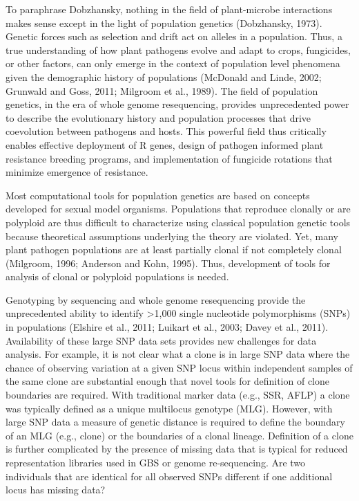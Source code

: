 \documentclass{frontiersSCNS} %
\begin{document}
To paraphrase Dobzhansky, nothing in the field of plant-microbe
interactions makes sense except in the light of population genetics
(Dobzhansky, 1973). Genetic forces such as selection and drift act on
alleles in a population. Thus, a true understanding of how plant
pathogens evolve and adapt to crops, fungicides, or other factors, can
only emerge in the context of population level phenomena given the
demographic history of populations (McDonald and Linde, 2002; Grunwald
and Goss, 2011; Milgroom et al., 1989). The field of population
genetics, in the era of whole genome resequencing, provides
unprecedented power to describe the evolutionary history and population
processes that drive coevolution between pathogens and hosts. This
powerful field thus critically enables effective deployment of R genes,
design of pathogen informed plant resistance breeding programs, and
implementation of fungicide rotations that minimize emergence of
resistance.

Most computational tools for population genetics are based on concepts
developed for sexual model organisms. Populations that reproduce
clonally or are polyploid are thus difficult to characterize using
classical population genetic tools because theoretical assumptions
underlying the theory are violated. Yet, many plant pathogen populations
are at least partially clonal if not completely clonal (Milgroom, 1996;
Anderson and Kohn, 1995). Thus, development of tools for analysis of
clonal or polyploid populations is needed.

Genotyping by sequencing and whole genome resequencing provide the
unprecedented ability to identify \textgreater{}1,000 single nucleotide
polymorphisms (SNPs) in populations (Elshire et al., 2011; Luikart et
al., 2003; Davey et al., 2011). Availability of these large SNP data
sets provides new challenges for data analysis. For example, it is not
clear what a clone is in large SNP data where the chance of observing
variation at a given SNP locus within independent samples of the same
clone are substantial enough that novel tools for definition of clone
boundaries are required. With traditional marker data (e.g., SSR, AFLP)
a clone was typically defined as a unique multilocus genotype (MLG).
However, with large SNP data a measure of genetic distance is required
to define the boundary of an MLG (e.g., clone) or the boundaries of a
clonal lineage. Definition of a clone is further complicated by the
presence of missing data that is typical for reduced representation
libraries used in GBS or genome re-sequencing. Are two individuals that
are identical for all observed SNPs different if one additional locus
has missing data?
\end{document}
